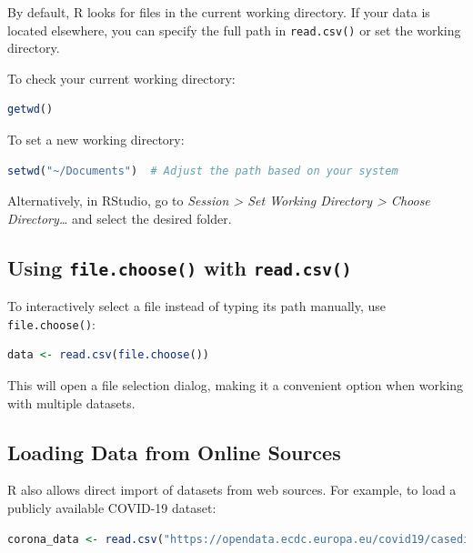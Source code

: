 \documentclass[
  11pt,
]{book}
\newcommand{\passthrough}[1]{#1}
\theoremstyle{definition}
\theoremstyle{definition}
\theoremstyle{definition}
\theoremstyle{definition}
\theoremstyle{remark}
\begin{document}
By default, R looks for files in the current working directory. If your data is located elsewhere, you can specify the full path in \passthrough{\lstinline!read.csv()!} or set the working directory.

To check your current working directory:

\begin{lstlisting}[language=R]
getwd()
\end{lstlisting}

To set a new working directory:

\begin{lstlisting}[language=R]
setwd("~/Documents")  # Adjust the path based on your system
\end{lstlisting}

Alternatively, in RStudio, go to \emph{Session \textgreater{} Set Working Directory \textgreater{} Choose Directory\ldots{}} and select the desired folder.

\subsection*{\texorpdfstring{Using \texttt{file.choose()} with \texttt{read.csv()}}{Using file.choose() with read.csv()}}\label{using-file.choose-with-read.csv}


To interactively select a file instead of typing its path manually, use \passthrough{\lstinline!file.choose()!}:

\begin{lstlisting}[language=R]
data <- read.csv(file.choose())
\end{lstlisting}

This will open a file selection dialog, making it a convenient option when working with multiple datasets.

\subsection*{Loading Data from Online Sources}\label{loading-data-from-online-sources}


R also allows direct import of datasets from web sources. For example, to load a publicly available COVID-19 dataset:

\begin{lstlisting}[language=R]
corona_data <- read.csv("https://opendata.ecdc.europa.eu/covid19/casedistribution/csv", na.strings = "", fileEncoding = "UTF-8-BOM")
\end{lstlisting}
\end{document}
